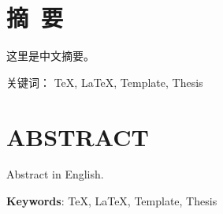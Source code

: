 \newpage

{
\let\clearpage\relax%
\centering{}

\vspace{8mm}

\chapter*{摘\ 要}
}

这里是中文摘要。

\vspace{8mm}
关键词： \TeX, \LaTeX, Template, Thesis

\newpage
{
\let\clearpage\relax%
\centering{}
\vspace{8mm}

\chapter*{ABSTRACT}
}

Abstract in English.

\vspace{8mm}

\textbf{Keywords}: \TeX, \LaTeX, Template, Thesis